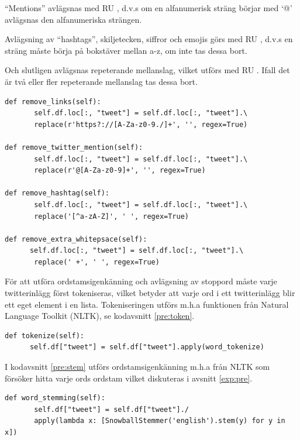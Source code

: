 \documentclass{kaumasters} %
\begin{document}
“Mentions” avlägsnas med RU , d.v.s om en alfanumerisk sträng börjar med ‘@’ avlägsnas den alfanumeriska strängen.

Avlägsning av “hashtags”, skiljetecken, siffror och emojis görs med RU , d.v.s en sträng måste börja på bokstäver mellan a-z, om inte tas dessa bort.

Och slutligen avlägsnas repeterande mellanslag, vilket utförs med RU . Ifall det är två eller fler repeterande mellanslag tas dessa bort.

\begin{lstlisting}[style=mypython,caption={Funktioner för att avlägsna URL:er, ''mention'', ''hashtags'', skiljetecken, siffror, emojis och repeterade mellanslag.},label=pre:rem]
def remove_links(self):
       self.df.loc[:, "tweet"] = self.df.loc[:, "tweet"].\
       replace(r'https?://[A-Za-z0-9./]+', '', regex=True)

def remove_twitter_mention(self):
       self.df.loc[:, "tweet"] = self.df.loc[:, "tweet"].\
       replace(r'@[A-Za-z0-9]+', '', regex=True)

def remove_hashtag(self):
       self.df.loc[:, "tweet"] = self.df.loc[:, "tweet"].\
       replace('[^a-zA-Z]', ' ', regex=True)

def remove_extra_whitepsace(self):
      self.df.loc[:, "tweet"] = self.df.loc[:, "tweet"].\
       replace(' +', ' ', regex=True)
\end{lstlisting}

För att utföra ordstamsigenkänning och avlägsning av stoppord måste varje twitterinlägg först tokeniseras, vilket betyder att varje ord i ett twitterinlägg blir ett eget element i en lista. Tokeniseringen utförs m.h.a funktionen  \cite{impl:006} från Natural Language Toolkit (NLTK), se kodavsnitt \ref{pre:token}.
\begin{lstlisting}[style=mypython,caption={Funktion för att tokenisera twitterinlägg.},label=pre:token]
def tokenize(self):
      self.df["tweet"] = self.df["tweet"].apply(word_tokenize)
\end{lstlisting}

I kodavsnitt \ref{pre:stem} utförs ordstamsigenkänning m.h.a  \cite{impl:008} från NLTK som försöker hitta varje ords ordstam vilket diskuteras i avsnitt \ref{exp:pre}.
\begin{lstlisting}[style=mypython,caption={Funktion för att utföra ordstamsigenkänning.},label=pre:stem]
def word_stemming(self):
       self.df["tweet"] = self.df["tweet"]./
       apply(lambda x: [SnowballStemmer('english').stem(y) for y in x])
\end{lstlisting}
\end{document}

